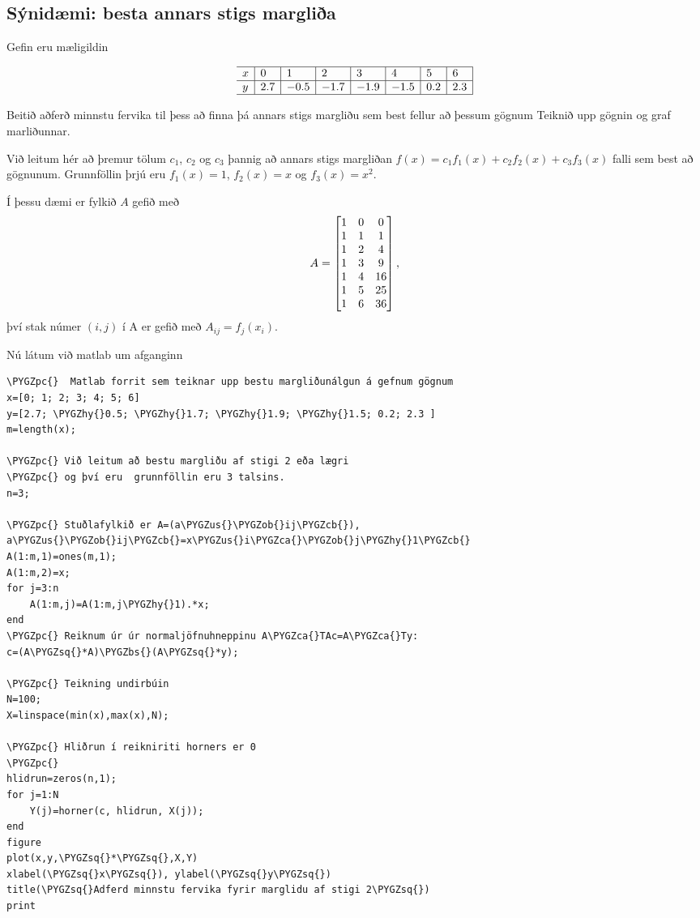\documentclass[letterpaper,10pt,icelandic]{sphinxmanual}
\def\PYGZbs{\char`\\}
\def\PYGZus{\char`\_}
\def\PYGZob{\char`\{}
\def\PYGZcb{\char`\}}
\def\PYGZca{\char`\^}
\def\PYGZpc{\char`\%}
\def\PYGZhy{\char`\-}
\def\PYGZsq{\char`\'}
\renewcommand\PYGZsq{\textquotesingle}
\begin{document}
\subsection{Sýnidæmi: besta annars stigs margliða}
\label{kafli03:synidaemi-besta-annars-stigs-marglia}
Gefin eru mæligildin

\[
\begin{array}{l|l|l|l|l|l|l|l|}
\hline
x & 0 &1 & 2 & 3 & 4 & 5 & 6\\
\hline
y & 2.7 & -0.5 & -1.7 & -1.9 & -1.5 & 0.2 & 2.3\\
\hline\end{array}
\]

Beitið aðferð minnstu fervika til þess að finna þá annars stigs margliðu
sem best fellur að þessum gögnum Teiknið upp gögnin og graf marliðunnar.

Við leitum hér að þremur tölum \(c_1\), \(c_2\) og
\(c_3\) þannig að annars stigs margliðan
\(f(x)=c_1f_1(x)+c_2f_2(x)+c_3f_3(x)\) falli sem best að gögnunum.
Grunnföllin þrjú eru \(f_1(x)=1\), \(f_2(x)=x\) og
\(f_3(x)=x^2\).

Í þessu dæmi er fylkið \(A\) gefið með
\begin{gather}
\begin{split}A=\left[\begin{matrix}
1 & 0&0\\
1 & 1&1\\
1&2&4\\
1&3&9\\
1&4&16\\
1&5&25\\
1&6&36
\end{matrix}\right],\end{split}\notag
\end{gather}
því stak númer \((i,j)\) í A er gefið með \(A_{ij} = f_j(x_i)\).

Nú látum við matlab um afganginn

\begin{Verbatim}[commandchars=\\\{\}]
\PYGZpc{}  Matlab forrit sem teiknar upp bestu margliðunálgun á gefnum gögnum
x=[0; 1; 2; 3; 4; 5; 6]
y=[2.7; \PYGZhy{}0.5; \PYGZhy{}1.7; \PYGZhy{}1.9; \PYGZhy{}1.5; 0.2; 2.3 ]
m=length(x);

\PYGZpc{} Við leitum að bestu margliðu af stigi 2 eða lægri
\PYGZpc{} og því eru  grunnföllin eru 3 talsins.
n=3;

\PYGZpc{} Stuðlafylkið er A=(a\PYGZus{}\PYGZob{}ij\PYGZcb{}), a\PYGZus{}\PYGZob{}ij\PYGZcb{}=x\PYGZus{}i\PYGZca{}\PYGZob{}j\PYGZhy{}1\PYGZcb{}
A(1:m,1)=ones(m,1);
A(1:m,2)=x;
for j=3:n
    A(1:m,j)=A(1:m,j\PYGZhy{}1).*x;
end
\PYGZpc{} Reiknum úr úr normaljöfnuhneppinu A\PYGZca{}TAc=A\PYGZca{}Ty:
c=(A\PYGZsq{}*A)\PYGZbs{}(A\PYGZsq{}*y);

\PYGZpc{} Teikning undirbúin
N=100;
X=linspace(min(x),max(x),N);

\PYGZpc{} Hliðrun í reikniriti horners er 0
\PYGZpc{}
hlidrun=zeros(n,1);
for j=1:N
    Y(j)=horner(c, hlidrun, X(j));
end
figure
plot(x,y,\PYGZsq{}*\PYGZsq{},X,Y)
xlabel(\PYGZsq{}x\PYGZsq{}), ylabel(\PYGZsq{}y\PYGZsq{})
title(\PYGZsq{}Adferd minnstu fervika fyrir marglidu af stigi 2\PYGZsq{})
print
\end{Verbatim}
\end{document}
